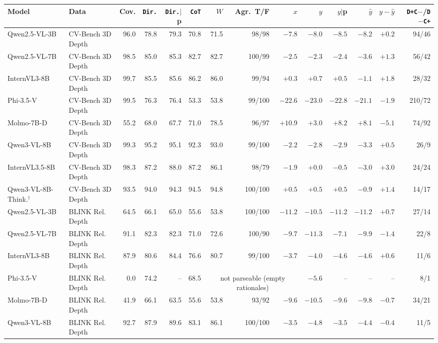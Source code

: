 \begin{tabular}{llrrrrrrrrrrrr}
\toprule
Model & Data & Cov. & \texttt{Dir.} & \texttt{Dir.}$|$p & \texttt{CoT} & $W$ & Agr.\ T/F & $x$ & $y$ & $y|$p & $\hat y$ & $y-\hat y$ & \texttt{D+C$-$}/\texttt{D$-$C+} \\
\midrule
Qwen2.5-VL-3B & CV-Bench 3D Depth & 96.0 & 78.8 & 79.3 & 70.8 & 71.5 & 98/98 & $-7.8$ & $-8.0$ & $-8.5$ & $-8.2$ & $+0.2$ & 94/46 \\
Qwen2.5-VL-7B & CV-Bench 3D Depth & 98.5 & 85.0 & 85.3 & 82.7 & 82.7 & 100/99 & $-2.5$ & $-2.3$ & $-2.4$ & $-3.6$ & $+1.3$ & 56/42 \\
InternVL3-8B & CV-Bench 3D Depth & 99.7 & 85.5 & 85.6 & 86.2 & 86.0 & 99/94 & $+0.3$ & $+0.7$ & $+0.5$ & $-1.1$ & $+1.8$ & 28/32 \\
Phi-3.5-V & CV-Bench 3D Depth & 99.5 & 76.3 & 76.4 & 53.3 & 53.8 & 99/100 & $-22.6$ & $-23.0$ & $-22.8$ & $-21.1$ & $-1.9$ & 210/72 \\
Molmo-7B-D & CV-Bench 3D Depth & 55.2 & 68.0 & 67.7 & 71.0 & 78.5 & 96/97 & $+10.9$ & $+3.0$ & $+8.2$ & $+8.1$ & $-5.1$ & 74/92 \\
Qwen3-VL-8B & CV-Bench 3D Depth & 99.3 & 95.2 & 95.1 & 92.3 & 93.0 & 99/100 & $-2.2$ & $-2.8$ & $-2.9$ & $-3.3$ & $+0.5$ & 26/9 \\
InternVL3.5-8B & CV-Bench 3D Depth & 98.3 & 87.2 & 88.0 & 87.2 & 86.1 & 98/79 & $-1.9$ & $+0.0$ & $-0.5$ & $-3.0$ & $+3.0$ & 24/24 \\
Qwen3-VL-8B-Think.$^\dagger$ & CV-Bench 3D Depth & 93.5 & 94.0 & 94.3 & 94.5 & 94.8 & 100/100 & $+0.5$ & $+0.5$ & $+0.5$ & $-0.9$ & $+1.4$ & 14/17 \\
\midrule
Qwen2.5-VL-3B & BLINK Rel. Depth & 64.5 & 66.1 & 65.0 & 55.6 & 53.8 & 100/100 & $-11.2$ & $-10.5$ & $-11.2$ & $-11.2$ & $+0.7$ & 27/14 \\
Qwen2.5-VL-7B & BLINK Rel. Depth & 91.1 & 82.3 & 82.3 & 71.0 & 72.6 & 100/90 & $-9.7$ & $-11.3$ & $-7.1$ & $-9.9$ & $-1.4$ & 22/8 \\
InternVL3-8B & BLINK Rel. Depth & 87.9 & 80.6 & 84.4 & 76.6 & 80.7 & 99/100 & $-3.7$ & $-4.0$ & $-4.6$ & $-4.6$ & $+0.6$ & 11/6 \\
Phi-3.5-V & BLINK Rel. Depth & 0.0 & 74.2 & -- & 68.5 & \multicolumn{3}{c}{not parseable (empty rationales)} & $-5.6$ & -- & -- & -- & 8/1 \\
Molmo-7B-D & BLINK Rel. Depth & 41.9 & 66.1 & 63.5 & 55.6 & 53.8 & 93/92 & $-9.6$ & $-10.5$ & $-9.6$ & $-9.8$ & $-0.7$ & 34/21 \\
Qwen3-VL-8B & BLINK Rel. Depth & 92.7 & 87.9 & 89.6 & 83.1 & 86.1 & 100/100 & $-3.5$ & $-4.8$ & $-3.5$ & $-4.4$ & $-0.4$ & 11/5 \\

\end{tabular}
